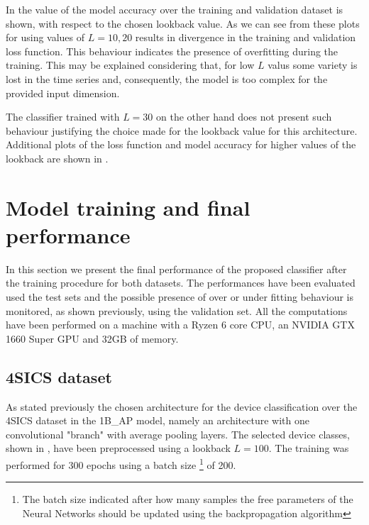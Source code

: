 In  the value of the model accuracy over the training and validation dataset is shown, with respect to the chosen lookback value. As we can see from these plots for using values of $L=10,20$ results in divergence in the training and validation loss function. This behaviour indicates the presence of overfitting during the training. This may be explained considering that, for low $L$ valus some variety is lost in the time series and, consequently, the model is too complex for the provided input dimension.

The classifier trained with $L=30$ on the other hand does not present such behaviour justifying the choice made for the lookback value for this architecture. Additional plots of the loss function and model accuracy for higher values of the lookback are shown in .





\section{Model training and final performance}\label{res_test}

In this section we present the final performance of the proposed classifier after the training procedure for both datasets. The performances have been evaluated used the test sets and the possible presence of over or under fitting behaviour is monitored, as shown previously, using the validation set. All the computations have been performed on a machine with a Ryzen 6 core CPU, an NVIDIA GTX 1660 Super GPU and 32GB of memory.




\subsection{4SICS dataset}

As stated previously the chosen architecture for the device classification over the 4SICS dataset in the 1B\_AP model, namely an architecture with one convolutional "branch" with average pooling layers. The selected device classes, shown in , have been preprocessed using a lookback $L=100$. The training was performed for 300 epochs using a batch size \footnote{The batch size indicated after how many samples the free parameters of the Neural Networks should be updated using the backpropagation algorithm} of 200. 

